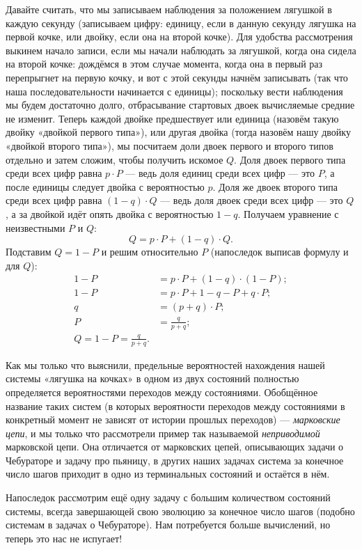 \documentclass{article}
\begin{document}
Давайте считать, что мы записываем наблюдения за положением лягушкой в каждую секунду (записываем цифру: единицу, если в данную секунду лягушка на первой кочке, или двойку, если она на второй кочке). Для удобства рассмотрения выкинем начало записи, если мы начали наблюдать за лягушкой, когда она сидела на второй кочке: дождёмся в этом случае момента, когда она в первый раз перепрыгнет на первую кочку, и вот с этой секунды начнём записывать (так что наша последовательности начинается с единицы); поскольку вести наблюдения мы будем достаточно долго, отбрасывание стартовых двоек вычисляемые средние не изменит. Теперь каждой двойке предшествует или единица (назовём такую двойку «двойкой первого типа»), или другая двойка (тогда назовём нашу двойку «двойкой второго типа»), мы посчитаем доли двоек первого и второго типов отдельно и затем сложим, чтобы получить искомое $Q$. 
Доля двоек первого типа среди всех цифр равна $p\cdot P$ --- ведь доля единиц среди всех цифр --- это $P$, а после единицы следует двойка с вероятностью $p$. 
Доля же двоек второго типа среди всех цифр равна $(1-q)\cdot Q$ --- ведь доля двоек среди всех цифр --- это $Q$, 
а за двойкой идёт опять двойка с вероятностью $1-q$. 
Получаем уравнение с неизвестными $P$ и $Q$:
\[Q=p\cdot P+(1-q)\cdot Q.\]
Подставим $Q=1-P$ и решим относительно $P$ 
(напоследок выписав формулу и для $Q$):
\begin{align*}
1-P&=p\cdot P+(1-q)\cdot (1-P);
\\
1-P&=p\cdot P+1-q-P+q\cdot P;
\\
q&=(p+q)\cdot P;
\\
P&=\frac{q}{p+q};
\\
Q=1-P=\frac{q}{p+q}.
\end{align*}

Как мы только что выяснили, предельные вероятностей нахождения нашей системы «лягушка на кочках» в одном из двух состояний полностью определяется вероятностями переходов между состояниями. Обобщённое название таких систем (в которых вероятности переходов между состояниями в конкретный момент не зависят от истории прошлых переходов) --- \emph{марковские цепи}, 
и мы только что рассмотрели пример так называемой \emph{неприводимой} марковской цепи. 
Она отличается от марковских цепей, описывающих задачи о Чебураторе и задачу про пьяницу, в других наших задачах система за конечное число шагов приходит в одно из терминальных состояний и остаётся в нём.

Напоследок рассмотрим ещё одну задачу с большим количеством состояний системы, всегда завершающей свою эволюцию за конечное число шагов (подобно системам в задачах о Чебураторе). Нам потребуется больше вычислений, но теперь это нас не испугает!
\end{document}
